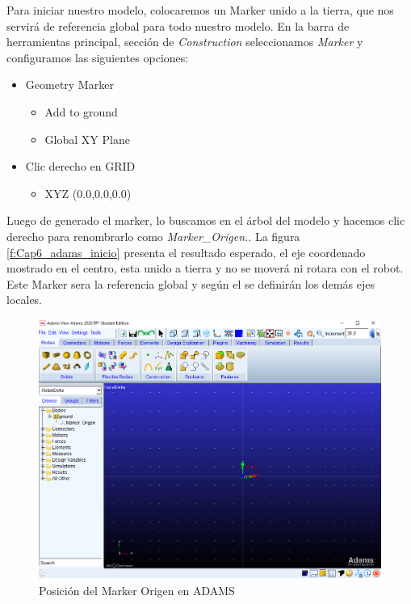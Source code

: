         Para iniciar nuestro modelo, colocaremos un Marker unido a la tierra, que nos servirá de referencia global para todo nuestro modelo. En la barra de herramientas principal, sección de \textit{Construction} seleccionamos \textit{Marker} y configuramos las siguientes opciones:

        \begin{scope}
            \renewcommand{\labelitemi}{\blacklozenge}
            \renewcommand{\labelitemii}{\checkmark}
            \begin{itemize}
                \item Geometry Marker
                \begin{itemize}
                    \item Add to ground 
                    \item Global XY Plane
                \end{itemize}
                \item Clic derecho en GRID
                \begin{itemize}
                    \item XYZ (0.0,0.0,0.0)
                \end{itemize}
            \end{itemize}
        \end{scope}

        
        Luego de generado el marker, lo buscamos en el árbol del modelo y hacemos clic derecho para renombrarlo como \textit{Marker\_Origen.}. La figura \eqref{f:Cap6_adams_inicio} presenta el resultado esperado, el eje coordenado mostrado en el centro, esta unido a tierra y no se moverá ni rotara con el robot. Este Marker sera la referencia global y según el se definirán los demás ejes locales.
        
        \begin{figure}[H]
            \centering
            \includegraphics[width=1\linewidth]{Main/Chapter6/Images6/adams/inicio.png}
            \caption{Posición del Marker Origen en ADAMS}
            \label{f:Cap6_adams_inicio}
        \end{figure}
        

